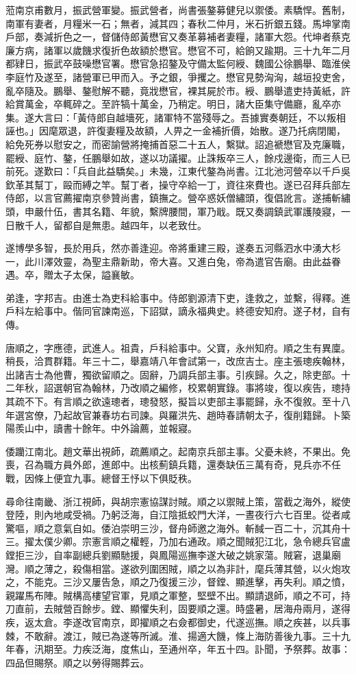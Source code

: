 \begin{pinyinscope}
蒞南京甫數月，振武營軍變。振武營者，尚書張鏊募健兒以禦倭。素驕悍。舊制，南軍有妻者，月糧米一石；無者，減其四；春秋二仲月，米石折銀五錢。馬坤掌南戶部，奏減折色之一，督儲侍郎黃懋官又奏革募補者妻糧，諸軍大怨。代坤者蔡克廉方病，諸軍以歲饑求復折色故額於懋官。懋官不可，給餉又踰期。三十九年二月都肄日，振武卒鼓噪懋官署。懋官急招鏊及守備太監何綬、魏國公徐鵬舉、臨淮侯李庭竹及遂至，諸營軍已甲而入。予之銀，爭攫之。懋官見勢洶洶，越垣投吏舍，亂卒隨及。鵬舉、鏊慰解不聽，竟戕懋官，裸其屍於市。綬、鵬舉遣吏持黃紙，許給賞萬金，卒輒碎之。至許犒十萬金，乃稍定。明日，諸大臣集守備廳，亂卒亦集。遂大言曰：「黃侍郎自越墻死，諸軍特不當殘辱之。吾據實奏朝廷，不以叛相誣也。」因麾眾退，許復妻糧及故額，人畀之一金補折價，始散。遂乃托病閉閣，給免死券以慰安之，而密諭營將掩捕首惡二十五人，繫獄。詔追褫懋官及克廉職，罷綬、庭竹、鏊，任鵬舉如故，遂以功議擢。止誅叛卒三人，餘戍邊衛，而三人已前死。遂歎曰：「兵自此益驕矣。」未幾，江東代鏊為尚書。江北池河營卒以千戶吳欽革其幫丁，毆而縛之竿。幫丁者，操守卒給一丁，資往來費也。遂已召拜兵部左侍郎，以言官薦擢南京參贊尚書，鎮撫之。營卒惑妖僧繡頭，復倡訛言。遂捕斬繡頭，申嚴什伍，書其名籍、年貌，繫牌腰間，軍乃戢。既又奏調鎮武軍護陵寢，一日散千人，留都自是無患。越四年，以老致仕。

遂博學多智，長於用兵，然亦善逢迎。帝將重建三殿，遂奏五河縣泗水中湧大杉一，此川澤效靈，為聖主鼎新助，帝大喜。又進白兔，帝為遣官告廟。由此益眷遇。卒，贈太子太保，謚襄敏。

弟逢，字邦吉。由進士為吏科給事中。侍郎劉源清下吏，逢救之，並繫，得釋。進戶科左給事中。偕同官諫南巡，下詔獄，謫永福典史。終德安知府。遂子材，自有傳。

唐順之，字應德，武進人。祖貴，戶科給事中。父寶，永州知府。順之生有異廩。稍長，洽貫群籍。年三十二，舉嘉靖八年會試第一，改庶吉士。座主張璁疾翰林，出諸吉士為他曹，獨欲留順之。固辭，乃調兵部主事。引疾歸。久之，除吏部。十二年秋，詔選朝官為翰林，乃改順之編修，校累朝實錄。事將竣，復以疾告，璁持其疏不下。有言順之欲遠璁者，璁發怒，擬旨以吏部主事罷歸，永不復敘。至十八年選宮僚，乃起故官兼春坊右司諫。與羅洪先、趙時春請朝太子，復削籍歸。卜築陽羨山中，讀書十餘年。中外論薦，並報寢。

倭躪江南北。趙文華出視師，疏薦順之。起南京兵部主事。父憂未終，不果出。免喪，召為職方員外郎，進郎中。出核薊鎮兵籍，還奏缺伍三萬有奇，見兵亦不任戰，因條上便宜九事。總督王忬以下俱貶秩。

尋命往南畿、浙江視師，與胡宗憲協謀討賊。順之以禦賊上策，當截之海外，縱使登陸，則內地咸受禍。乃躬泛海，自江陰抵蛟門大洋，一晝夜行六七百里。從者咸驚嘔，順之意氣自如。倭泊崇明三沙，督舟師邀之海外。斬馘一百二十，沉其舟十三。擢太僕少卿。宗憲言順之權輕，乃加右通政。順之聞賊犯江北，急令總兵官盧鏜拒三沙，自率副總兵劉顯馳援，與鳳陽巡撫李遂大破之姚家蕩。賊窘，退巢廟灣。順之薄之，殺傷相當。遂欲列圍困賊，順之以為非計，麾兵薄其營，以火炮攻之，不能克。三沙又屢告急，順之乃復援三沙，督鏜、顯進擊，再失利。順之憤，親躍馬布陣。賊構高樓望官軍，見順之軍整，堅壁不出。顯請退師，順之不可，持刀直前，去賊營百餘步。鏜、顯懼失利，固要順之還。時盛暑，居海舟兩月，遂得疾，返太倉。李遂改官南京，即擢順之右僉都御史，代遂巡撫。順之疾甚，以兵事棘，不敢辭。渡江，賊已為遂等所滅。淮、揚適大饑，條上海防善後九事。三十九年春，汛期至。力疾泛海，度焦山，至通州卒，年五十四。訃聞，予祭葬。故事：四品但賜祭。順之以勞得賜葬云。


\end{pinyinscope}
